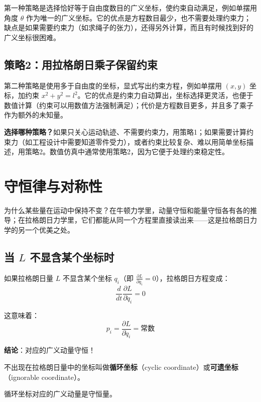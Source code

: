 第一种策略是选择恰好等于自由度数目的广义坐标，使约束自动满足，例如单摆用角度 $\theta$ 作为唯一的广义坐标。它的优点是方程数目最少，也不需要处理约束力；缺点是如果需要约束力（如求绳子的张力），还得另外计算，而且有时候找到好的广义坐标很困难。

\subsection{策略2：用拉格朗日乘子保留约束}

第二种策略是使用多于自由度的坐标，显式写出约束方程，例如单摆用 $(x, y)$ 坐标，加约束 $x^2 + y^2 = l^2$。它的优点是约束力自动算出，坐标选择更灵活，也便于数值计算（约束可以用数值方法强制满足）；代价是方程数目更多，并且多了乘子作为额外的未知量。

\begin{insightbox}
\textbf{选择哪种策略？}如果只关心运动轨迹、不需要约束力，用策略1；如果需要计算约束力（如工程设计中需要知道零件受力），或者约束比较复杂、难以用简单坐标描述，用策略2。数值仿真中通常使用策略2，因为它便于处理约束稳定性。
\end{insightbox}

\section{守恒律与对称性}

为什么某些量在运动中保持不变？在牛顿力学里，动量守恒和能量守恒各有各的推导；在拉格朗日力学里，它们都能从同一个方程里直接读出来——这是拉格朗日力学的另一个优美之处。

\subsection{当 $L$ 不显含某个坐标时}

如果拉格朗日量 $L$ 不显含某个坐标 $q_i$（即 $\frac{\partial L}{\partial q_i} = 0$），拉格朗日方程变成：
\[
\frac{d}{dt}\frac{\partial L}{\partial \dot{q}_i} = 0
\]

这意味着：
\[
p_i = \frac{\partial L}{\partial \dot{q}_i} = \text{常数}
\]

\textbf{结论}：对应的广义动量守恒！

\begin{definition}[循环坐标]
不出现在拉格朗日量中的坐标叫做\textbf{循环坐标}（cyclic coordinate）或\textbf{可遗坐标}（ignorable coordinate）。

循环坐标对应的广义动量是守恒量。
\end{definition}

